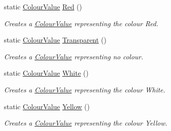\begin{DoxyCompactItemize}
static \hyperlink{classphys_1_1ColourValue}{ColourValue} \hyperlink{classphys_1_1ColourValue_a3c379d7dfd72c1c77b78701b86ea3ffd}{Red} ()
\begin{DoxyCompactList}\small\item\em Creates a \hyperlink{classphys_1_1ColourValue}{ColourValue} representing the colour Red. \item\end{DoxyCompactList}\item 
static \hyperlink{classphys_1_1ColourValue}{ColourValue} \hyperlink{classphys_1_1ColourValue_ac54c32635131885b41a09fc2cec33d47}{Transparent} ()
\begin{DoxyCompactList}\small\item\em Creates a \hyperlink{classphys_1_1ColourValue}{ColourValue} representing no colour. \item\end{DoxyCompactList}\item 
static \hyperlink{classphys_1_1ColourValue}{ColourValue} \hyperlink{classphys_1_1ColourValue_ad6bcb6ff4ec09fbc02282cd324d3856b}{White} ()
\begin{DoxyCompactList}\small\item\em Creates a \hyperlink{classphys_1_1ColourValue}{ColourValue} representing the colour White. \item\end{DoxyCompactList}\item 
static \hyperlink{classphys_1_1ColourValue}{ColourValue} \hyperlink{classphys_1_1ColourValue_a7140182497bc7b894b68f4b17d08dfa4}{Yellow} ()
\begin{DoxyCompactList}\small\item\em Creates a \hyperlink{classphys_1_1ColourValue}{ColourValue} representing the colour Yellow. \item\end{DoxyCompactList}\end{DoxyCompactItemize}

